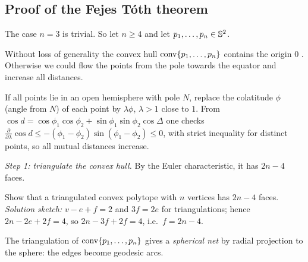 \subsection{Proof of the Fejes T\'oth theorem}

The case $n=3$ is trivial. So let $n\ge 4$ and let $p_1,\dots,p_n\in\mathbb{S}^2$.

Without loss of generality the convex hull $\operatorname{conv}\{p_1,\dots,p_n\}$ contains the origin $0$
. Otherwise we could flow the points from the pole towards the equator
 and increase all distances.
\begin{addedblock}
If all points lie in an open hemisphere with pole $N$, replace the colatitude $\phi$ (angle from $N$) of
each point by $\lambda\phi$, $\lambda>1$ close to $1$. From
$\cos d=\cos\phi_1\cos\phi_2+\sin\phi_1\sin\phi_2\cos\Delta$ one checks
$\frac{\partial}{\partial\lambda}\cos d\le-(\phi_1-\phi_2)\sin(\phi_1-\phi_2)\le0$, with strict
inequality for distinct points, so all mutual distances increase.
\end{addedblock}

\emph{Step 1: triangulate the convex hull.}
By the Euler characteristic, it has $2n-4$ faces.

\begin{exercise}\label{L2:ex:euler}
Show that a triangulated convex polytope with $n$ vertices has $2n-4$ faces.
\emph{Solution sketch:} $v-e+f=2$ and $3f=2e$ for triangulations; hence $2n-2e+2f=4$, so
$2n-3f+2f=4$, i.e.\ $f=2n-4$.
\end{exercise}

The triangulation of $\operatorname{conv}\{p_1,\dots,p_n\}$ gives a \emph{spherical net} by radial projection to the
sphere: the edges become geodesic arcs.

